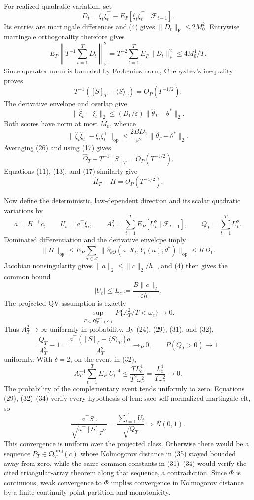 For realized quadratic variation, set
\[
 D_t=\xi_t\xi_t^\top-E_P[\xi_t\xi_t^\top\mid\mathcal F_{t-1}].
\tag{22}
\]
Its entries are martingale differences and (4) gives \(\|D_t\|_{\mathrm F}\le2M_0^2\). Entrywise martingale orthogonality therefore gives
\[
 E_P\left\|T^{-1}\sum_{t=1}^TD_t\right\|_{\mathrm F}^2
 =T^{-2}\sum_{t=1}^TE_P\|D_t\|_{\mathrm F}^2
 \le4M_0^4/T.
\tag{23}
\]
Since operator norm is bounded by Frobenius norm, Chebyshev's inequality proves
\[
 T^{-1}([S]_T-\langle S\rangle_T)=O_P(T^{-1/2}).
\tag{24}
\]
The derivative envelope and overlap give
\[
 \|\widehat\xi_t-\xi_t\|_2
 \le(D_1/\varepsilon)\|\widehat\theta_T-\theta^*\|_2.
\tag{25}
\]
Both scores have norm at most \(M_0\), whence
\[
 \|\widehat\xi_t\widehat\xi_t^\top-\xi_t\xi_t^\top\|_{\mathrm{op}}
 \le\frac{2BD_1}{\varepsilon^2}\|\widehat\theta_T-\theta^*\|_2.
\tag{26}
\]
Averaging (26) and using (17) gives
\[
 \widehat\Omega_T-T^{-1}[S]_T=O_P(T^{-1/2}).
\tag{27}
\]
Equations (11), (13), and (17) similarly give
\[
 \widehat H_T-H=O_P(T^{-1/2}).
\tag{28}
\]

Now define the deterministic, law-dependent direction and its scalar quadratic variations by
\[
 a=H^{-\top}c,\qquad U_t=a^\top\xi_t,\qquad
 A_T^2=\sum_{t=1}^TE_P[U_t^2\mid\mathcal F_{t-1}],\qquad
 Q_T=\sum_{t=1}^TU_t^2.
\tag{29}
\]
Dominated differentiation and the derivative envelope imply
\[
 \|H\|_{\mathrm{op}}
 \le E_P\sum_{a\in\mathcal A}
 \|\partial_\theta g(a,X_t,Y_t(a);\theta^*)\|_{\mathrm{op}}
 \le KD_1.
\tag{30}
\]
Jacobian nonsingularity gives \(\|a\|_2\le\|c\|_2/h_-\), and (4) then gives the common bound
\[
 |U_t|\le L_c:=\frac{B\|c\|_2}{\varepsilon h_-}.
\tag{31}
\]
The projected-QV assumption is exactly
\[
 \sup_{P\in\mathfrak Q_T^{\mathrm{proj}}(c)}
 P\{A_T^2/T<\omega_c\}\longrightarrow0.
\tag{32}
\]
Thus \(A_T^2\to\infty\) uniformly in probability. By (24), (29), (31), and (32),
\[
 \frac{Q_T}{A_T^2}-1
 =\frac{a^\top([S]_T-\langle S\rangle_T)a}{A_T^2}
 \longrightarrow_P0,
 \qquad P(Q_T>0)\longrightarrow1
\tag{33}
\]
uniformly. With \(\delta=2\), on the event in (32),
\[
 A_T^{-4}\sum_{t=1}^TE_P|U_t|^4
 \le\frac{TL_c^4}{T^2\omega_c^2}
 =\frac{L_c^4}{T\omega_c^2}\longrightarrow0.
\tag{34}
\]
The probability of the complementary event tends uniformly to zero. Equations (29), (32)--(34) verify every hypothesis of \(\mathrm{lem:saco\text{-}self\text{-}normalized\text{-}martingale\text{-}clt}\), so
\[
 \frac{a^\top S_T}{\sqrt{a^\top[S]_Ta}}
 =\frac{\sum_{t=1}^TU_t}{\sqrt{Q_T}}
 \Rightarrow N(0,1).
\tag{35}
\]
This convergence is uniform over the projected class. Otherwise there would be a sequence \(P_T\in\mathfrak Q_T^{\mathrm{proj}}(c)\) whose Kolmogorov distance in (35) stayed bounded away from zero, while the same common constants in (31)--(34) would verify the cited triangular-array theorem along that sequence, a contradiction. Since \(\Phi\) is continuous, weak convergence to \(\Phi\) implies convergence in Kolmogorov distance by a finite continuity-point partition and monotonicity.

